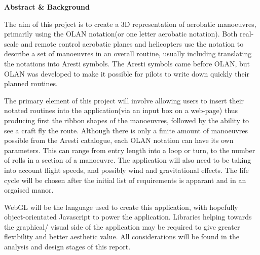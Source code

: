 \thispagestyle{empty}

\begin{center}
{\LARGE\bf Abstract \& Background}
\end{center}

The aim of this project is to create a 3D representation of aerobatic manoeuvres, primarily using the OLAN notation(or one letter aerobatic notation). Both real-scale and remote control aerobatic planes and helicopters use the notation to describe a set of manoeuvres in an overall routine, usually including translating the notations into Aresti symbols. The Aresti symbols came before OLAN, but OLAN was developed to make it possible for pilots to write down quickly their planned routines.

The primary element of this project will involve allowing users to insert their notated routines into the application(via an input box on a web-page) thus producing first the ribbon shapes of the manoeuvres, followed by the ability to see a craft fly the route. Although there is only a finite amount of manoeuvres possible from the Aresti catalogue, each OLAN notation can have its own parameters. This can range from entry length into a loop or turn, to the number of rolls in a section of a manoeuvre. The application will also need to be taking into account flight speeds, and possibly wind and gravitational effects. The life cycle will be chosen after the initial list of requirements is apparant and in an orgaised manor.

WebGL will be the language used to create this application, with hopefully object-orientated Javascript to power the application. Libraries helping towards the graphical/ visual side of the application may be required to give greater flexibility and better aesthetic value. All considerations will be found in the analysis and design stages of this report.